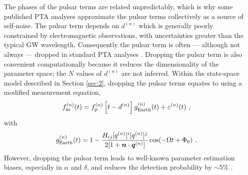 \documentclass[fleqn,usenatbib,useAMS]{mnras}
\begin{document}
The phases of the pulsar terms are related unpredictably, which is why some published PTA analyses approximate the pulsar terms collectively as a source of self-noise. The pulsar term depends on $d^{(n)}$ which is generally poorly constrained by electromagnetic observations, with uncertainties greater than the typical GW wavelength. Consequently the pulsar term is often --- although not always --- dropped in standard PTA analyses \citep[e.g.][]{Sesana2010,Babak2012,Petiteau2013,Zhu2015,Taylors2016,Goldstein2018,Charisi2023arXiv230403786C}. Dropping the pulsar term is also convenient computationally because it reduces the dimensionality of the parameter space; the $N$ values of $d^{(n)}$ are not inferred. Within the state-space model described in Section \ref{sec:2}, dropping the pulsar terms equates to using a modified measurement equation,
\begin{equation}
	f_{\rm m}^{(n)}(t) = f_{\rm p}^{(n)}\left [t-d^{(n)} \right ] g^{(n)}_{\rm Earth}(t) + \varepsilon^{(n)}(t) \ , 
	\label{eq:measuremen_earth}
\end{equation}
with
\begin{equation}
	g^{(n)}_{\rm Earth}(t) = 1 - \frac{ H_{ij}[q^{(n)}]^i [q^{(n)}]^j}{2[1 + \boldsymbol{n}\cdot \boldsymbol{q}^{(n)}] }  \cos(-\Omega t +\Phi_0)  \ .
	\label{eq:g_func_trig_earth}
\end{equation}
However, dropping the pulsar term leads to well-known parameter estimation biases, especially in $\alpha$ and $\delta$, and reduces the detection probability by $\sim 5 \%$ \citep{Zhupulsarterms,Chen2022,KimpsonPTA}. 
\end{document}
